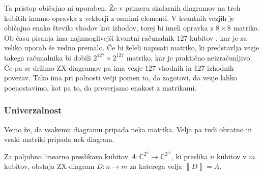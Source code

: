 \documentclass[mat1]{fmfdelo}
\newcommand{\C}{\mathbb C}
\newcommand{\interpret}[1]{\left\llbracket #1 \right\rrbracket}
\begin{document}
Ta pristop običajno ni uporaben. Že v primeru skalarnih diagramov na treh kubitih imamo opravka z vektorji z osmimi elementi. V kvantnih vezjih je običajno enako število vhodov kot izhodov, torej bi imeli opravka z \(8\times8\) matriko. Ob času pisanja ima najzmoglivejši kvantni računalnik \(127\) kubitov \cite{hugh}, kar je za veliko uporab še vedno premalo. Če bi želeli napisati matriko, ki predstavlja vezje takega računalnika bi dobili \(2^{127}\times 2^{127}\) matriko, kar je praktično neizračunljivo. Če pa se držimo ZX-diagramov pa ima vezje 127 vhodnih in 127 izhodnih povezav. Tako ima pri polnosti večji pomen to, da zagotovi, da vezje lahko poenostavimo, kot pa to, da preverjamo enakost z matrikami.
\subsubsection{Univerzalnost}
Vemo že, da vsakemu diagramu pripada neka matrika. Velja pa tudi obratno in vsaki matriki pripada nek diagram.
\begin{izrek}[Univerzalnost]
    Za poljubno linearno preslikavo kubitov \(A:\C^{2^n}\to \C^{2^m}\), ki preslika \(n\) kubitov v \(m\) kubitov, obstaja ZX-diagram \(D:n\to m\) za katerega velja \(\interpret{D}=A\).
\end{izrek}
\end{document}
